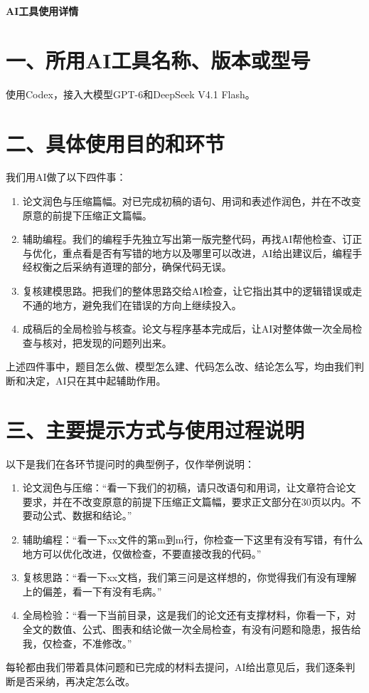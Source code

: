 \documentclass[UTF8,fontset=none,a4paper,zihao=5]{ctexart}
\begin{document}
\begin{center}\Large\bfseries AI工具使用详情\end{center}
\vspace{-0.2em}
\section*{一、所用AI工具名称、版本或型号}
使用Codex，接入大模型GPT-6和DeepSeek V4.1 Flash。

\section*{二、具体使用目的和环节}
我们用AI做了以下四件事：
\begin{enumerate}
\item 论文润色与压缩篇幅。对已完成初稿的语句、用词和表述作润色，并在不改变原意的前提下压缩正文篇幅。
\item 辅助编程。我们的编程手先独立写出第一版完整代码，再找AI帮他检查、订正与优化，重点看是否有写错的地方以及哪里可以改进，AI给出建议后，编程手经权衡之后采纳有道理的部分，确保代码无误。
\item 复核建模思路。把我们的整体思路交给AI检查，让它指出其中的逻辑错误或走不通的地方，避免我们在错误的方向上继续投入。
\item 成稿后的全局检验与核查。论文与程序基本完成后，让AI对整体做一次全局检查与核对，把发现的问题列出来。
\end{enumerate}
上述四件事中，题目怎么做、模型怎么建、代码怎么改、结论怎么写，均由我们判断和决定，AI只在其中起辅助作用。

\section*{三、主要提示方式与使用过程说明}
以下是我们在各环节提问时的典型例子，仅作举例说明：
\begin{enumerate}
\item 论文润色与压缩：“看一下我们的初稿，请只改语句和用词，让文章符合论文要求，并在不改变原意的前提下压缩正文篇幅，要求正文部分在30页以内。不要动公式、数据和结论。”
\item 辅助编程：“看一下xx文件的第m到m行，你检查一下这里有没有写错，有什么地方可以优化改进，仅做检查，不要直接改我的代码。”
\item 复核思路：“看一下xx文档，我们第三问是这样想的，你觉得我们有没有理解上的偏差，看一下有没有毛病。”
\item 全局检验：“看一下当前目录，这是我们的论文还有支撑材料，你看一下，对全文的数值、公式、图表和结论做一次全局检查，有没有问题和隐患，报告给我，仅检查，不准修改。”
\end{enumerate}
每轮都由我们带着具体问题和已完成的材料去提问，AI给出意见后，我们逐条判断是否采纳，再决定怎么改。
\end{document}
